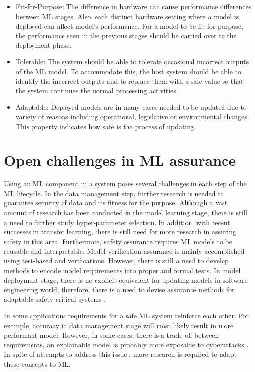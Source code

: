 \begin{itemize}
    \item Fit-for-Purpose: The difference in hardware can cause performance differences between ML stages. Also, each distinct hardware setting where a model is deployed can affect model's performance. For a model to be fit for purpose, the performance seen in the previous stages should be carried over to the deployment phase. 
    \item Tolerable: The system should be able to tolerate occasional incorrect outputs of the ML model. To accommodate this, the host system should be able to identify the incorrect outputs and to replace them with a safe value so that the system continues the normal processing activities.
    \item Adaptable: Deployed models are in many cases needed to be updated due to variety of reasons including operational, legislative or environmental changes. This property indicates how safe is the process of updating. 
\end{itemize}

\section{Open challenges in ML assurance}
Using an ML component in a system poses several challenges in each step of the ML lifecycle. In the data management step, further research is needed to guarantee security of data and its fitness for the purpose. Although a vast amount of research has been conducted in the model learning stage, there is still a need to further study hyper-parameter selection. In addition, with recent successes in transfer learning, there is still need for more research in assuring safety in this area. Furthermore, safety assurance requires ML models to be reusable and interpretable. Model verification assurance is mainly accomplished using test-based and verifications. However, there is still a need to develop methods to encode model requirements into proper and formal tests. In model deployment stage, there is no explicit equivalent for updating models in software engineering world, therefore, there is a need to devise assurance methods for adaptable safety-critical systems \cite{Ashmore2021}.

In some applications requirements for a safe ML system reinforce each other. For example, accuracy in data management stage will most likely result in more performant model. However, in some cases, there is a trade-off between requirements, an explainable model is probably more exposable to cyberattacks \cite{Ashmore2021}. In spite of attempts to address this issue \cite{Johnson2019}, more research is required to adapt these concepts to ML.  